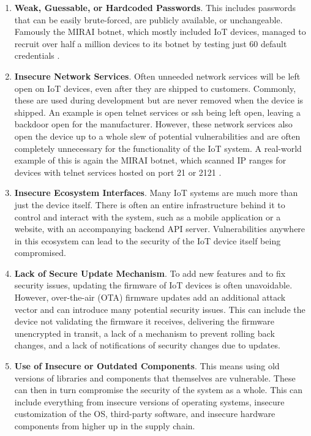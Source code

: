 \begin{enumerate}
    \item \textbf{Weak, Guessable, or Hardcoded Passwords}. This includes passwords that can be easily brute-forced, are publicly available, or unchangeable. Famously the MIRAI botnet, which mostly included IoT devices, managed to recruit over half a million devices to its botnet by testing just 60 default credentials \cite{understanding-mirai}.
    
    \item \textbf{Insecure Network Services}. Often unneeded network services will be left open on IoT devices, even after they are shipped to customers. Commonly, these are used during development but are never removed when the device is shipped. An example is open telnet services or ssh being left open, leaving a backdoor open for the manufacturer. However, these network services also open the device up to a whole slew of potential vulnerabilities and are often completely unnecessary for the functionality of the IoT system. A real-world example of this is again the MIRAI botnet, which scanned IP ranges for devices with telnet services hosted on port 21 or 2121 \cite{understanding-mirai}.
    
    \item \textbf{Insecure Ecosystem Interfaces}. Many IoT systems are much more than just the device itself. There is often an entire infrastructure behind it to control and interact with the system, such as a mobile application or a website, with an accompanying backend API server. Vulnerabilities anywhere in this ecosystem can lead to the security of the IoT device itself being compromised.
    
    \item \textbf{Lack of Secure Update Mechanism}. To add new features and to fix security issues, updating the firmware of IoT devices is often unavoidable. However, over-the-air (OTA) firmware updates add an additional attack vector and can introduce many potential security issues. This can include the device not validating the firmware it receives, delivering the firmware unencrypted in transit, a lack of a mechanism to prevent rolling back changes, and a lack of notifications of security changes due to updates.
    
    \item \textbf{Use of Insecure or Outdated Components}. This means using old versions of libraries and components that themselves are vulnerable. These can then in turn compromise the security of the system as a whole. This can include everything from insecure versions of operating systems, insecure customization of the OS, third-party software, and insecure hardware components from higher up in the supply chain.
    

\end{enumerate}
